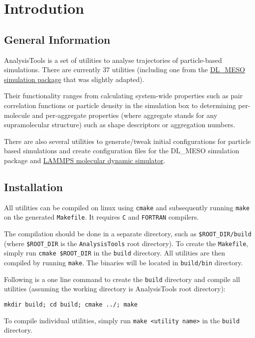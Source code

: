 \chapter{Introdution}

\section{General Information}
AnalysisTools is a set of utilities to analyse trajectories of
particle-based simulations. There are currently 37 utilities (including one
from the \href{https://www.scd.stfc.ac.uk/Pages/DL_MESO.aspx}{DL\_MESO
simulation package} that was slightly adapted).

Their functionality ranges from calculating system-wide properties such as
pair correlation functions or particle density in the simulation box to
determining per-molecule and per-aggregate properties (where aggregate
stands for any supramolecular structure) such as shape descriptors or
aggregation numbers.

There are also several utilities to generate/tweak initial configurations
for particle based simulations and create configuration files for the
DL\_MESO simulation package and \href{https://lammps.sandia.gov/}{LAMMPS
molecular dynamic simulator}.

\section{Installation}

All utilities can be compiled on linux using \texttt{cmake} and subsequently
running \texttt{make} on the generated \texttt{Makefile}. It requires
\texttt{C} and \texttt{FORTRAN} compilers.

The compilation should be done in a separate directory, such as
\texttt{\$ROOT\_DIR/build} (where \texttt{\$ROOT\_DIR} is the
\texttt{AnalysisTools} root directory). To create the \texttt{Makefile},
simply run \texttt{cmake \$ROOT\_DIR} in the \texttt{build} directory.  All
utilities are then compiled by running \texttt{make}.  The binaries will be
located in \texttt{build/bin} directory.

Following is a one line command to create the \texttt{build} directory and
compile all utilities (assuming the working directory is AnalysisTools root
directory):

\texttt{mkdir build; cd build; cmake ../; make}

To compile individual utilities, simply run \texttt{make <utility name>} in
the \texttt{build} directory.
